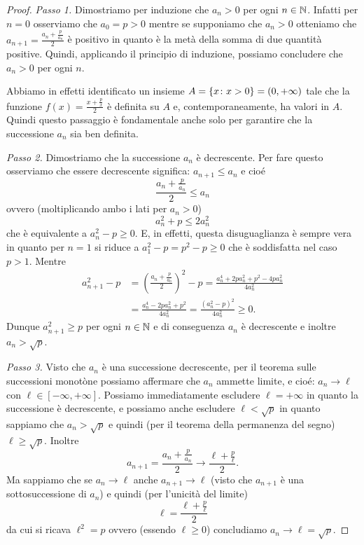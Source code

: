 \begin{proof}
\emph{Passo 1.} Dimostriamo per induzione che $a_n>0$ per ogni $n\in {\mathbb N}$.
Infatti per $n=0$ osserviamo che $a_0=p>0$ mentre se supponiamo che
$a_n>0$ otteniamo che $a_{n+1} = \frac{a_n + \frac p {a_n}}2$ è positivo in quanto
è la metà della somma di due quantità positive. Quindi, applicando il
principio di induzione, possiamo concludere che $a_n>0$ per ogni $n$.

Abbiamo in effetti identificato un insieme $A={\left\{ x\colon x>0 \right\}} = (0,
+\infty)$ tale che la funzione $f(x) = \frac{x + \frac p x}{2}$ è definita
su $A$ e, contemporaneamente, ha valori in $A$.
Quindi questo passaggio è fondamentale anche solo per
garantire che la successione $a_n$ sia ben definita.

\emph{Passo 2.} Dimostriamo che la successione $a_n$ è decrescente.
Per fare questo osserviamo che essere decrescente significa:
$ a_{n+1} \le a_n$
e cioé
\[
\frac{a_n + \frac p {a_n}}{2} \le a_n
\]
ovvero (moltiplicando ambo i lati per $a_n>0$)
\[
a_n^2 + p \le 2 a_n^2
\]
che è equivalente a $a_n^2 - p \ge 0$. E, in effetti, questa
disuguaglianza è sempre vera in quanto per $n=1$ si riduce a $a_1^2 - p
= p^2 - p \ge 0$ che è soddisfatta nel caso $p>1$. Mentre
\begin{align*}
a_{n+1}^2 - p & = \left(\frac{a_n+\frac p{a_n}}{2}\right)^2 - p
= \frac{a_n^4 + 2 p a_n^2 + p^2 - 4 p a_n^2}{4 a_n^2} \\
& = \frac{a_n^4 - 2 p a_n^2 + p^2}{4 a_n^2}
 = \frac{\left(a_n^2 - p\right)^2}{4a_n^2} \ge 0.
\end{align*}
Dunque $a_{n+1}^2 \ge p$ per ogni $n\in {\mathbb N}$ e di conseguenza $a_n$ è
decrescente e inoltre $a_n > \sqrt p$.

\emph{Passo 3.}
Visto che $a_n$ è una successione decrescente,
per il teorema sulle successioni monotòne possiamo
affermare che $a_n$ ammette limite, e cioé: $a_n \to \ell$ con $\ell
\in [-\infty, +\infty]$. Possiamo immediatamente escludere
$\ell=+\infty$ in quanto la successione è decrescente, e possiamo
anche escludere $\ell<\sqrt{p}$ in quanto sappiamo che $a_n > \sqrt{p}$ e quindi
(per il teorema della permanenza del segno) $\ell \ge \sqrt p$.
Inoltre
\[
  a_{n+1} = \frac{a_n + \frac p{a_n}}{2} \to \frac{\ell + \frac p \ell}{2}.
\]
Ma sappiamo che se $a_n\to \ell$ anche $a_{n+1}\to \ell$ (visto che
$a_{n+1}$ è una sottosuccessione di $a_n$) e quindi (per l'unicità del
limite)
\begin{equation}\label{ex_1_fixed}
  \ell = \frac{\ell + \frac p \ell}{2}
\end{equation}
da cui si ricava $\ell^2 = p$ ovvero (essendo $\ell\ge 0$) concludiamo
$a_n \to \ell =
\sqrt p$.
\end{proof}

